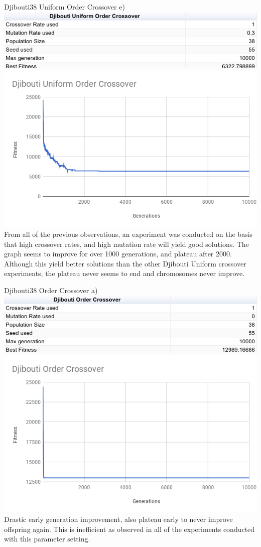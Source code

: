 \documentclass[conference]{IEEEtran}
\begin{document}
Djibouti38 Uniform Order Crossover e)
\includegraphics[scale=0.42]{Djibouti38/UOC/Djibouti38_UOC_e)_table}
\includegraphics[scale=0.42]{Djibouti38/UOC/Djibouti38_UOC_e)}
From all of the previous observations, an experiment was conducted on the basis that high crossover rates, and high mutation rate will yield good solutions. The graph seems to improve for over 1000 generations, and plateau after 2000. Although this yield better solutions than the other Djibouti Uniform crossover experiments, the plateau never seems to end and chromosomes never improve.


Djibouti38 Order Crossover a)
\includegraphics[scale=0.42]{Djibouti38/OC/Djibouti38_OC_a)_table}
\includegraphics[scale=0.42]{Djibouti38/OC/Djibouti38_OC_a)}
Drastic early generation improvement, also plateau early to never improve offspring again. This is inefficient as observed in all of the experiments conducted with this parameter setting.\\
\end{document}
